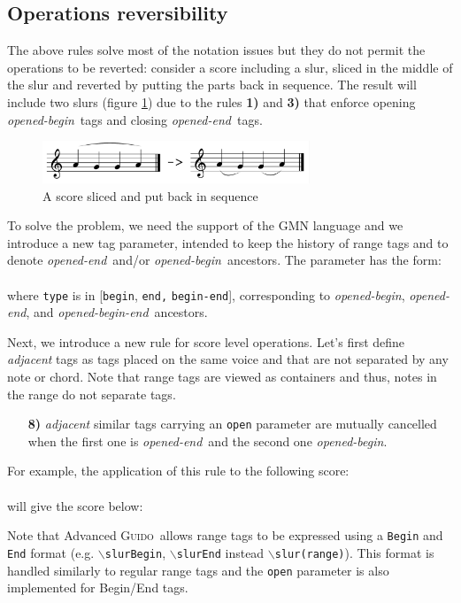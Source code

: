 \documentclass[twoside,10pt,a4paper]{article}
\newcommand{\Guido}		{\textsc{Guido}}
\newcommand{\code}[1]		{{\small \texttt{#1}}}
\newcommand{\gtag}[1]		{$\backslash$\code{#1}}
\newcommand{\rulenum}[1]	{\textbf{#1}}
\newcommand{\oend}			{\emph{opened-end}}
\newcommand{\obeg}			{\emph{opened-begin}}
\newcommand{\obegend}		{\emph{opened-begin-end}}
\newcommand{\codeindent}	{\\ \hspace*{9mm}}
\begin{document}
\subsection{Operations reversibility}\label{reverse}
The above rules solve most of the notation issues but they do not permit the operations to be reverted: consider a score including a slur, sliced in the middle of the slur and reverted by putting the parts back in sequence. The result will include two slurs (figure \ref{fig:rev}) due to the rules \rulenum{1)} and \rulenum{3)}  that enforce opening \obeg\ tags and closing \oend\ tags.
\begin{figure}[h]
	\centering \includegraphics[width=80mm]{imgs/reverse}
 \caption{A score sliced and put back in sequence}
 \label{fig:rev}
\end{figure}

To solve the problem, we need the support of the GMN language and we introduce a new tag parameter, intended to keep the history of range tags and to denote \oend\ and/or \obeg\ ancestors.
The parameter has the form: 
\codeindent \code{open="type"} \\
where \code{type} is in [\code{begin}, \code{end,} \code{begin-end}], corresponding to \obeg, \oend, and \obegend\ ancestors.

Next, we introduce a new rule for score level operations. Let's first define \emph{adjacent} tags as tags placed on the same voice and that are not separated by any note or chord. Note that range tags are viewed as containers and thus, notes in the range do not separate tags.
\begin{itemize}
\item[\rulenum{8)}] \emph{adjacent} similar tags carrying an \code{open} parameter are mutually cancelled when the first one is \oend\ and the second one \obeg . 
\end{itemize}
For example, the application of this rule to the following score: 
\codeindent \code{[ \gtag{anytag}<open="end">(f g) 
 \codeindent \gtag{anytag}<open="begin">(f e) ]}\\
will give the score below:
\codeindent\code{[ \gtag{anytag}(f g f e) ]} 

Note that Advanced \Guido\ allows range tags to be expressed using a \code{Begin} and \code{End} format (e.g. \gtag{slurBegin}, \gtag{slurEnd} instead \gtag{slur(range)}). This format is handled similarly to regular range tags and the \code{open} parameter is also implemented for Begin/End tags.
\end{document}
